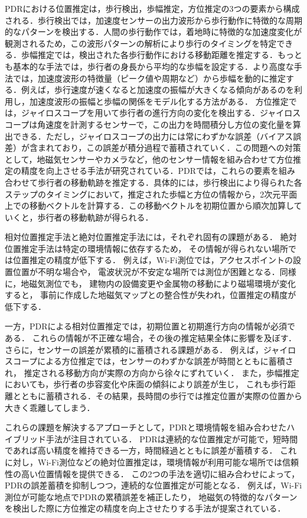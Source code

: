 PDRにおける位置推定は，歩行検出，歩幅推定，方位推定の3つの要素から構成される．歩行検出では，加速度センサーの出力波形から歩行動作に特徴的な周期的なパターンを検出する．人間の歩行動作では，着地時に特徴的な加速度変化が観測されるため，この波形パターンの解析により歩行のタイミングを特定できる．歩幅推定では，検出された各歩行動作における移動距離を推定する．もっとも基本的な手法では，歩行者の身長から平均的な歩幅を設定する．より高度な手法では，加速度波形の特徴量（ピーク値や周期など）から歩幅を動的に推定する．例えば，歩行速度が速くなると加速度の振幅が大きくなる傾向があるのを利用し，加速度波形の振幅と歩幅の関係をモデル化する方法がある．
方位推定では，ジャイロスコープを用いて歩行者の進行方向の変化を検出する．ジャイロスコープは角速度を計測するセンサーで，この出力を時間積分し方位の変化量を算出できる．ただし，ジャイロスコープの出力には常にわずかな誤差（バイアス誤差）が含まれており，この誤差が積分過程で蓄積されていく．この問題への対策として，地磁気センサーやカメラなど，他のセンサー情報を組み合わせて方位推定の精度を向上させる手法が研究されている．PDRでは，これらの要素を組み合わせて歩行者の移動軌跡を推定する．具体的には，歩行検出により得られた各ステップのタイミングにおいて，推定された歩幅と方位の情報から，2次元平面上での移動ベクトルを計算する．この移動ベクトルを初期位置から順次加算していくと，歩行者の移動軌跡が得られる．


相対位置推定手法と絶対位置推定手法には，それぞれ固有の課題がある．
絶対位置推定手法は特定の環境情報に依存するため，
その情報が得られない場所では位置推定の精度が低下する．
例えば，Wi-Fi測位では，アクセスポイントの設置位置が不明な場合や，
電波状況が不安定な場所では測位が困難となる．同様に，地磁気測位でも，
建物内の設備変更や金属物の移動により磁場環境が変化すると，
事前に作成した地磁気マップとの整合性が失われ，位置推定の精度が低下する．

一方，PDRによる相対位置推定では，初期位置と初期進行方向の情報が必須である．
これらの情報が不正確な場合，その後の推定結果全体に影響を及ぼす．
さらに，センサーの誤差が累積的に蓄積される課題がある．
例えば，ジャイロスコープによる方位推定では，センサーのわずかな誤差が時間とともに蓄積され，
推定される移動方向が実際の方向から徐々にずれていく．
また，歩幅推定においても，歩行者の歩容変化や床面の傾斜により誤差が生じ，
これも歩行距離とともに蓄積される．その結果，長時間の歩行では推定位置が実際の位置から大きく乖離してしまう．

これらの課題を解決するアプローチとして，PDRと環境情報を組み合わせたハイブリッド手法が注目されている．
PDRは連続的な位置推定が可能で，短時間であれば高い精度を維持できる一方，時間経過とともに誤差が蓄積する．
これに対し，Wi-Fi測位などの絶対位置推定は，環境情報が利用可能な場所では信頼性の高い位置情報を提供できる．
この2つの手法を適切に組み合わせによって，PDRの誤差蓄積を抑制しつつ，連続的な位置推定が可能となる．
例えば，Wi-Fi測位が可能な地点でPDRの累積誤差を補正したり，
地磁気の特徴的なパターンを検出した際に方位推定の精度を向上させたりする手法が提案されている．

